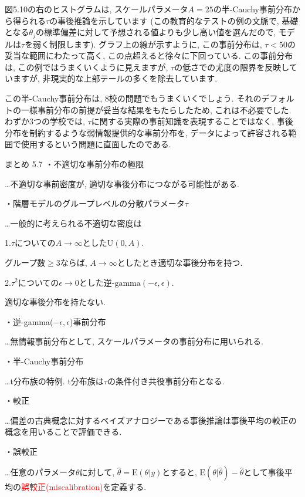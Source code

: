 \documentclass[10pt,dvipdfmx,a4]{beamer}
\newcommand{\tcr}[1]{\textcolor{red}{#1}}
\begin{document}
\begin{frame}
図5.10の右のヒストグラムは, スケールパラメータ$A=25$の半-Cauchy事前分布から得られる$\tau$の事後推論を示しています
(この教育的なテストの例の文脈で, 基礎となる$\theta_j$の標準偏差に対して予想される値よりも少し高い値を選んだので, モデルは$\tau$を弱く制限します).
グラフ上の線が示すように, この事前分布は, $\tau<50$の妥当な範囲にわたって高く, この点超えると徐々に下回っている.
この事前分布は, この例ではうまくいくように見えますが, $\tau$の低さでの尤度の限界を反映していますが, 非現実的な上部テールの多くを除去しています.

この半-Cauchy事前分布は, 8校の問題でもうまくいくでしょう.
それのデフォルトの一様事前分布の前提が妥当な結果をもたらしたため, これは不必要でした.
わずか3つの学校では, $\tau$に関する実際の事前知識を表現することではなく, 事後分布を制約するような弱情報提供的な事前分布を, データによって許容される範囲で使用するという問題に直面したのである.
\end{frame}


\begin{frame}{まとめ 5.7}
・不適切な事前分布の極限

…不適切な事前密度が, 適切な事後分布につながる可能性がある.

・階層モデルのグループレベルの分散パラメータ$\tau$

…一般的に考えられる不適切な密度は

1.$\tau$についての$A\rightarrow \infty$とした$\text{U}(0, A)$.

グループ数$\geq 3$ならば, $A\rightarrow\infty$としたとき適切な事後分布を持つ.

2.$\tau^2$についての$\epsilon\rightarrow 0$とした逆-$\text{gamma}(-\epsilon, \epsilon)$.

適切な事後分布を持たない.

・逆-gamma($-\epsilon,\epsilon$)事前分布

…無情報事前分布として, スケールパラメータの事前分布に用いられる.

・半-Cauchy事前分布

…t分布族の特例.
t分布族は$\tau$の条件付き共役事前分布となる.
\end{frame}


\begin{frame}
・較正

…偏差の古典概念に対するベイズアナロジーである事後推論は事後平均の較正の概念を用いることで評価できる.

・誤較正

…任意のパラメータ$\theta$に対して, $\hat{\theta}=\text{E}(\theta|y)$とすると, $\text{E}(\theta|
\hat{\theta})-\hat{\theta}$として事後平均の\tcr{誤較正(miscalibration)}を定義する.
\end{frame}

\end{document}
